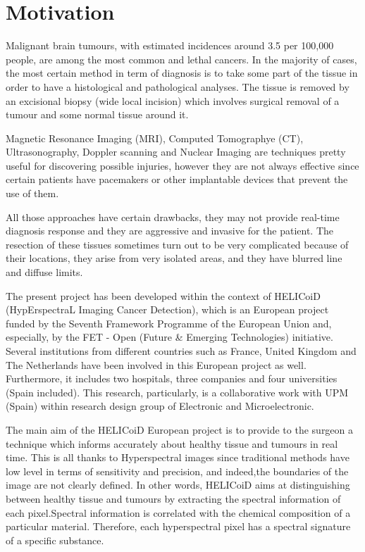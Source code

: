   \section{Motivation}
  
  Malignant brain tumours, with estimated incidences around 3.5 per 100,000 people, are among the most common and lethal cancers. In the majority of cases, the most certain method in term of diagnosis is to take some part of the tissue in order to have a histological and pathological analyses. The tissue is removed by an excisional biopsy (wide local incision) which involves surgical removal of a tumour and some normal tissue around it.
    
  Magnetic Resonance Imaging (MRI), Computed Tomographye (CT), Ultrasonography, Doppler scanning and Nuclear Imaging are techniques pretty useful for discovering possible injuries, however they are not always effective since certain patients have pacemakers or other implantable devices that prevent the use of them.
  
  	All those approaches have certain drawbacks, they may not provide real-time diagnosis response and they are aggressive and invasive for the patient. The resection of these tissues sometimes turn out to be very complicated because of their locations, they arise from very isolated areas, and they have blurred line and diffuse limits.
    
    The present project has been developed within the context of HELICoiD (HypErspectraL Imaging Cancer Detection), which is an European project funded by the Seventh Framework Programme of the European Union and, especially, by the FET - Open (Future \& Emerging Technologies) initiative. Several institutions from different countries such as France, United Kingdom and The Netherlands have been involved in this European project as well. Furthermore, it includes two hospitals, three companies and four universities (Spain included).  This research, particularly, is a collaborative work with UPM (Spain) within research design group of Electronic and Microelectronic.

The main aim of the HELICoiD European project is to provide to the surgeon a technique which informs accurately about healthy tissue and tumours in real time. This is all thanks to Hyperspectral images since traditional methods have low level in terms of sensitivity and precision, and indeed,the boundaries of the image are not clearly defined. In other words, HELICoiD aims at distinguishing between healthy tissue and tumours by extracting the spectral information of each pixel.Spectral information is correlated with the chemical composition of a particular material. Therefore, each hyperspectral pixel has a spectral signature of a specific substance.



